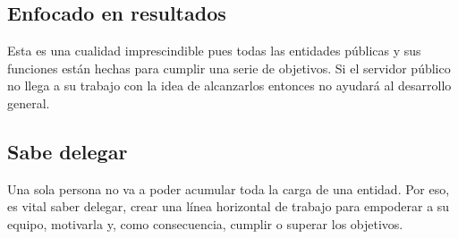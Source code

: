 \documentclass[
  letterpaper,
  DIV=11,
  numbers=noendperiod]{scrartcl}
\begin{document}
\hypertarget{enfocado-en-resultados}{%
\subsection{Enfocado en resultados}\label{enfocado-en-resultados}}

Esta es una cualidad imprescindible pues todas las entidades públicas y
sus funciones están hechas para cumplir una serie de objetivos. Si el
servidor público no llega a su trabajo con la idea de alcanzarlos
entonces no ayudará al desarrollo general.

\hypertarget{sabe-delegar}{%
\subsection{Sabe delegar}\label{sabe-delegar}}

Una sola persona no va a poder acumular toda la carga de una entidad.
Por eso, es vital saber delegar, crear una línea horizontal de trabajo
para empoderar a su equipo, motivarla y, como consecuencia, cumplir o
superar los objetivos.


\printbibliography
\end{document}
